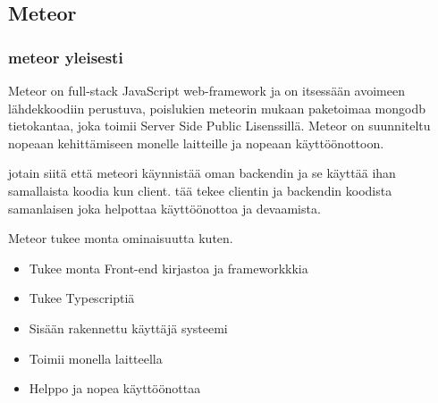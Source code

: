 \documentclass[11pt,a4paper,titlepage,oneside]{article}
\begin{document}
\newpage
\subsection{Meteor}                %



\subsubsection{meteor yleisesti}









Meteor on full-stack JavaScript web-framework ja on itsessään avoimeen lähdekkoodiin perustuva, 
poislukien meteorin mukaan paketoimaa mongodb tietokantaa, joka toimii Server Side Public Lisenssillä.
Meteor on suunniteltu nopeaan kehittämiseen monelle laitteille ja nopeaan käyttöönottoon.
%
\medskip

jotain siitä että meteori käynnistää oman backendin ja se käyttää ihan samallaista koodia kun client.
tää tekee clientin ja backendin koodista samanlaisen joka helpottaa käyttöönottoa ja devaamista.
\medskip

    

Meteor tukee monta ominaisuutta kuten.
\begin{itemize}
    \item Tukee monta Front-end kirjastoa ja frameworkkkia
    \item Tukee Typescriptiä
    \item Sisään rakennettu käyttäjä systeemi
    \item Toimii monella laitteella
    \item Helppo ja nopea käyttöönottaa 
\end{itemize}
\end{document}
